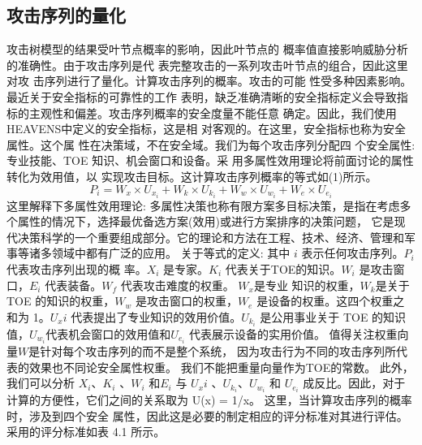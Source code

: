 \subsection{攻击序列的量化}
攻击树模型的结果受叶节点概率的影响，因此叶节点的
概率值直接影响威胁分析的准确性。由于攻击序列是代
表完整攻击的一系列攻击叶节点的组合，因此这里对攻
击序列进行了量化。计算攻击序列的概率。攻击的可能
性受多种因素影响。最近关于安全指标的可靠性的工作
\cite{samuel2020evaluating}表明，缺乏准确清晰的安全指标定义会导致指
标的主观性和偏差。攻击序列概率的安全度量不能任意
确定。因此，我们使用HEAVENS中定义的安全指标，这是相
对客观的。在这里，安全指标也称为安全属性。这个属
性在决策域，不在安全域。我们为每个攻击序列分配四
个安全属性:专业技能、TOE 知识、机会窗口和设备。采
用多属性效用理论将前面讨论的属性转化为效用值，以
实现攻击目标。这计算攻击序列概率的等式如(1)所示。
\begin{equation}
    P_i=W_x \times U_{x_i}+W_k \times U_{k_i}+W_w \times U_{w_i}+W_e \times U_{e_i}
    \end{equation}
\newline
这里解释下多属性效用理论\cite{winterfeldt1975multi}: 多属性决策也称有限方案多目标决策，是指在考虑多个属性的情况下，选择最优备选方案(效用)或进行方案排序的决策问题，
它是现代决策科学的一个重要组成部分。它的理论和方法在工程、技术、经济、管理和军事等诸多领域中都有广泛的应用。
\newline
关于等式的定义:
其中 $i$ 表示任何攻击序列。$P_i$代表攻击序列出现的概
率。$X_i$ 是专家。$K_i$ 代表关于TOE的知识。$W_i$ 是攻击窗口，$E_i$ 代表装备。$W_f$ 代表攻击难度的权重。 $W_x$是专业
知识的权重，$W_k$是关于 TOE 的知识的权重，$W_w$ 是攻击窗口的权重，$W_e$ 是设备的权重。这四个权重之和为
1。$U_xi$ 代表提出了专业知识的效用价值。$U_{k_i}$ 是公用事业关于 TOE 的知识值，$U_{w_i}$代表机会窗口的效用值和$U_{e_i}$ 代表展示设备的实用价值。
\newline
值得关注权重向量$W$是针对每个攻击序列的而不是整个系统，
因为攻击行为不同的攻击序列所代表的效果也不同论安全属性权重。
我们不能把重量向量作为TOE的常数。
此外，我们可以分析 $X_i$、$K_i$ 、$W_i$ 和$E_i$ 与 $U_xi$ 、$U_{k_i}$、$U_{w_i}$ 和 $U_{e_i}$ 成反比。因此，对于计算的方便性，它们之间的关系取为 U(x) = 1/x。
这里，当计算攻击序列的概率时，涉及到四个安全
属性，因此这是必要的制定相应的评分标准对其进行评估。采用的评分标准如表 4.1 所示。
